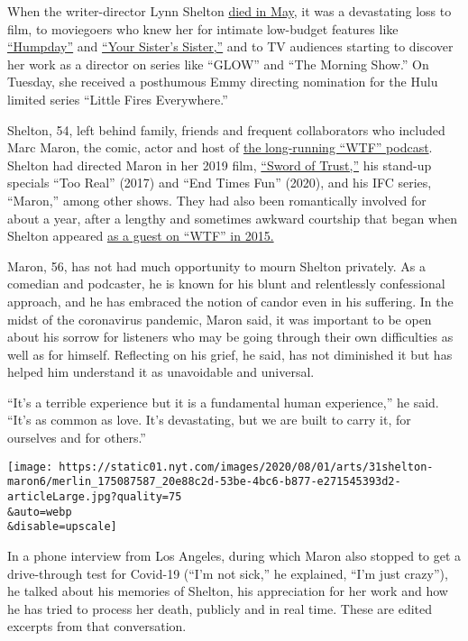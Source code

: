 When the writer-director Lynn Shelton
\href{https://www.nytimes.com/2020/05/16/obituaries/lynn-shelton-dead.html?searchResultPosition=4}{died
in May}, it was a devastating loss to film, to moviegoers who knew her
for intimate low-budget features like
\href{https://www.youtube.com/watch?v=RKy63pehrvw}{``Humpday''} and
\href{https://www.youtube.com/watch?v=wglzH4dUoLQ}{``Your Sister's
Sister,''} and to TV audiences starting to discover her work as a
director on series like ``GLOW'' and ``The Morning Show.'' On Tuesday,
she received a posthumous Emmy directing nomination for the Hulu limited
series ``Little Fires Everywhere.''

Shelton, 54, left behind family, friends and frequent collaborators who
included Marc Maron, the comic, actor and host of
\href{http://www.wtfpod.com/}{the long-running ``WTF'' podcast}. Shelton
had directed Maron in her 2019 film,
\href{https://www.youtube.com/watch?v=vWmQyBjrbfU\&t=5s}{``Sword of
Trust,''} his stand-up specials ``Too Real'' (2017) and ``End Times
Fun'' (2020), and his IFC series, ``Maron,'' among other shows. They had
also been romantically involved for about a year, after a lengthy and
sometimes awkward courtship that began when Shelton appeared
\href{http://www.wtfpod.com/podcast/episodes/episode_627_-_lynn_shelton}{as
a guest on ``WTF'' in 2015.}

Maron, 56, has not had much opportunity to mourn Shelton privately. As a
comedian and podcaster, he is known for his blunt and relentlessly
confessional approach, and he has embraced the notion of candor even in
his suffering. In the midst of the coronavirus pandemic, Maron said, it
was important to be open about his sorrow for listeners who may be going
through their own difficulties as well as for himself. Reflecting on his
grief, he said, has not diminished it but has helped him understand it
as unavoidable and universal.

``It's a terrible experience but it is a fundamental human experience,''
he said. ``It's as common as love. It's devastating, but we are built to
carry it, for ourselves and for others.''

\texttt{[image: https://static01.nyt.com/images/2020/08/01/arts/31shelton-maron6/merlin\_175087587\_20e88c2d-53be-4bc6-b877-e271545393d2-articleLarge.jpg?quality=75\\\&auto=webp\\\&disable=upscale]}

In a phone interview from Los Angeles, during which Maron also stopped
to get a drive-through test for Covid-19 (``I'm not sick,'' he
explained, ``I'm just crazy''), he talked about his memories of Shelton,
his appreciation for her work and how he has tried to process her death,
publicly and in real time. These are edited excerpts from that
conversation.


